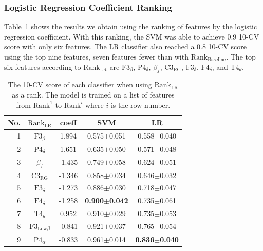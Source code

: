 \documentclass[pdflatex,sn-mathphys]{sn-jnl}%
\theoremstyle{thmstyleone}%
\theoremstyle{thmstyletwo}%
\theoremstyle{thmstylethree}%
\begin{document}
\subsubsection{Logistic Regression Coefficient Ranking}

Table~\ref{tab:cv_LR} shows the results we obtain using the ranking of features by the logistic regression coefficient. With this ranking, the SVM was able to achieve 0.9 10-CV score with only six features. The LR classifier also reached a 0.8 10-CV score using the top nine features, seven features fewer than with $\text{Rank}_{\text{Baseline}}$. The top six features according to $\text{Rank}_{\text{LR}}$ are $\text{F3}_{\beta}$, $\text{P4}_{\delta}$, $\beta_{f}$, $\text{C3}_{\text{RG}}$, $\text{F3}_{\delta}$, $\text{F4}_{\delta}$, and $\text{T4}_{\theta}$.

\begin{table}[h!]
\centering
\caption{The 10-CV score of each classifier when using $\text{Rank}_{\text{LR}}$ as a rank. The model is trained on a list of features from $\text{Rank}^1$ to $\text{Rank}^i$ where $i$ is the row number.}
\label{tab:cv_LR}
\begin{tabular}{r|cccc}
\hline
 No. &     $\text{Rank}_{\text{LR}}$ &  coeff &                      SVM &                       LR \\
\hline
   1 &           $\text{F3}_{\beta}$ &  1.894 &          0.575$\pm$0.051 &          0.558$\pm$0.040 \\
   2 &          $\text{P4}_{\delta}$ &  1.651 &          0.635$\pm$0.050 &          0.571$\pm$0.048 \\
   3 &                   $\beta_{f}$ & -1.435 &          0.749$\pm$0.058 &          0.624$\pm$0.051 \\
   4 &       $\text{C3}_{\text{RG}}$ & -1.346 &          0.858$\pm$0.034 &          0.646$\pm$0.032 \\
   5 &          $\text{F3}_{\delta}$ & -1.273 &          0.886$\pm$0.030 &          0.718$\pm$0.047 \\
   6 &          $\text{F4}_{\delta}$ & -1.258 & \textbf{0.900$\pm$0.042} &          0.735$\pm$0.061 \\
   7 &          $\text{T4}_{\theta}$ &  0.952 &          0.910$\pm$0.029 &          0.735$\pm$0.053 \\
   8 & $\text{F3}_{\text{Low}\beta}$ & -0.841 &          0.921$\pm$0.037 &          0.765$\pm$0.054 \\
   9 &          $\text{P4}_{\alpha}$ & -0.833 &          0.961$\pm$0.014 & \textbf{0.836$\pm$0.040} \\

\end{tabular}
\end{table}
\end{document}
